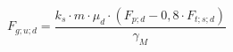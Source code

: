 \documentclass[12pt]{article}
\begin{document}
\begin{displaymath}
F_{g;u;d} = \frac {k_s \cdot m \cdot \mu_d \cdot (F_{p;d} - 0,8 \cdot F_{t;s;d} )} {\gamma_M}
\end{displaymath}
\end{document}
